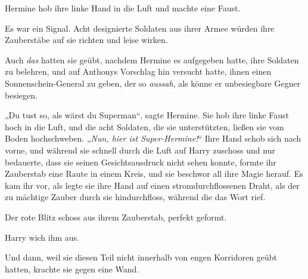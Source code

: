 Hermine hob ihre linke Hand in die Luft und machte eine Faust.

Es war ein Signal. Acht designierte Soldaten aus ihrer Armee würden ihre Zauberstäbe auf sie richten und leise  wirken.

Auch \emph{das} hatten sie geübt, nachdem Hermine es aufgegeben hatte, ihre Soldaten zu belehren, und auf Anthonys Vorschlag hin versucht hatte, ihnen einen Sonnenschein-General zu geben, der so \emph{aussah}, als könne er unbesiegbare Gegner besiegen.

„Du tust so, als wärst du Superman“, sagte Hermine. Sie hob ihre linke Faust hoch in die Luft, und die acht Soldaten, die sie unterstützten, ließen sie vom Boden hochschweben.
„\emph{Nun, hier ist Super-Hermine!}“ Ihre Hand schob sich nach vorne, und während sie schnell durch die Luft auf Harry zuschoss und nur bedauerte, dass sie seinen Gesichtsausdruck nicht sehen konnte, formte ihr Zauberstab eine Raute in einem Kreis, und sie beschwor all ihre Magie herauf. Es kam ihr vor, als legte sie ihre Hand auf einen stromdurchflossenen Draht, als der zu mächtige Zauber durch sie hindurchfloss, während die das Wort  rief.

Der rote Blitz schoss aus ihrem Zauberstab, perfekt geformt.

Harry wich ihm aus.

Und dann, weil sie diesen Teil nicht innerhalb von engen Korridoren geübt hatten, krachte sie gegen eine Wand.

